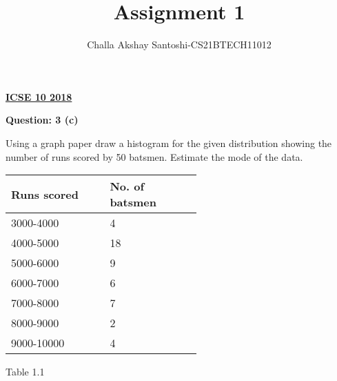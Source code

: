 \documentclass[journal,12pt,twocolumn]{IEEEtran}
\begin{document}
\newcommand{\myvec}[1]{\ensuremath{\begin{pmatrix}#1\end{pmatrix}}}
\newcommand{\mydet}[1]{\ensuremath{\begin{vmatrix}#1\end{vmatrix}}}
\makeatletter
{}
\makeatother
\let\StandardTheFigure\thefigure
\let\vec\mathbf
\renewcommand{\thefigure}{\theproblem}
\def\putbox#1#2#3{\makebox[0in][l]{\makebox[#1][l]{}\raisebox{\baselineskip}[0in][0in]{\raisebox{#2}[0in][0in]{#3}}}}
     \def\rightbox#1{\makebox[0in][r]{#1}}
     \def\centbox#1{\makebox[0in]{#1}}
     \def\topbox#1{\raisebox{-\baselineskip}[0in][0in]{#1}}
     \def\midbox#1{\raisebox{-0.5\baselineskip}[0in][0in]{#1}}
\vspace{3cm}
\title{Assignment 1}
\author{Challa Akshay Santoshi-CS21BTECH11012}
\maketitle
\newpage
\bigskip
\renewcommand{\thefigure}{\theenumi}
\renewcommand{\thetable}{\theenumi}
\begin{center}
  \textbf{\underline{ICSE 10 2018}}\\
\end{center}
\begin{center}
  \textbf{Question: 3 (c)}  
\end{center}
Using a graph paper draw a histogram for the given distribution showing the number of runs scored by 50 batsmen. Estimate the mode of the data.\\
\begin{table}[h!]
\centering
    \begin{tabular}{|p{0.30\linewidth}|p{0.25\linewidth}|}
    \hline
    \textbf{Runs scored} & \textbf{No. of batsmen}\\[0.5ex]
    \hline
    3000-4000 & 4\\
    \hline
    4000-5000 &18\\
    \hline
    5000-6000 & 9\\
    \hline
    6000-7000 & 6\\
    \hline
    7000-8000 & 7\\
    \hline
    8000-9000 & 2\\
    \hline
    9000-10000 & 4\\
    \hline
    \end{tabular}
\end{table}
\begin{center}
Table 1.1\\
\end{center}
\end{document}
